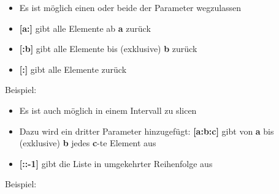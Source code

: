 \begin{frame}
    \slidehead
    \begin{itemize}
        \item Es ist möglich einen oder beide der Parameter wegzulassen
            \pause
        \item \textbf{[a:]} gibt alle Elemente ab \textbf{a} zurück
            \pause
        \item \textbf{[:b]} gibt alle Elemente bis (exklusive) \textbf{b} zurück
            \pause
        \item \textbf{[:]} gibt alle Elemente zurück
    \end{itemize}
    \pause
    \vspace{-0.1cm}
    \begin{block}{Beispiel:}
    \end{block}
\end{frame}

\begin{frame}
    \slidehead
    \begin{itemize}
        \item Es ist auch möglich in einem Intervall zu slicen
            \pause
        \item Dazu wird ein dritter Parameter hinzugefügt: \textbf{[a:b:c]} gibt von \textbf{a} bis (exklusive) \textbf{b} jedes \textbf{c}-te Element aus
            \pause
        \item \textbf{[::-1]} gibt die Liste in umgekehrter Reihenfolge aus
    \end{itemize}
    \pause
    \vspace{-0.1cm}
    \begin{block}{Beispiel:}
    \end{block}
\end{frame}

\livecoding


\subtitle{Kapitel 5: ganz viele variablen in einer}

